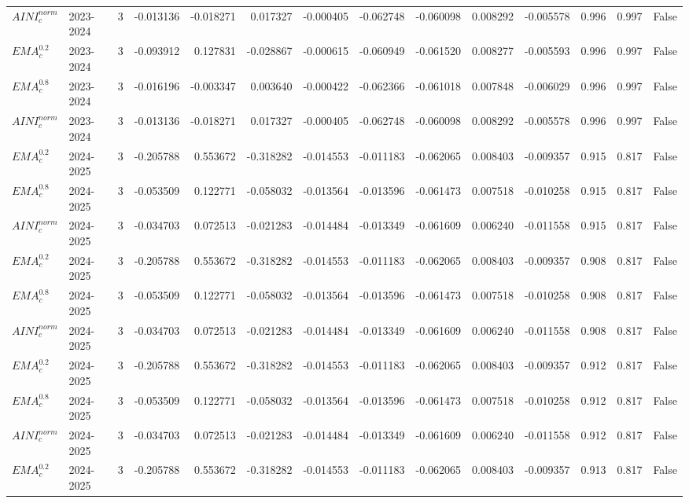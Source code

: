 \begin{tabular}{@{}llrrrrrrrrrlll@{}}
$AINI^{norm}_{c}$ & 2023-2024 & 3 & -0.013136 & -0.018271 & 0.017327 & -0.000405 & -0.062748 & -0.060098 & 0.008292 & -0.005578 & 0.996 & 0.997 & False \\
$EMA^{0.2}_{c}$ & 2023-2024 & 3 & -0.093912 & 0.127831 & -0.028867 & -0.000615 & -0.060949 & -0.061520 & 0.008277 & -0.005593 & 0.996 & 0.997 & False \\
$EMA^{0.8}_{c}$ & 2023-2024 & 3 & -0.016196 & -0.003347 & 0.003640 & -0.000422 & -0.062366 & -0.061018 & 0.007848 & -0.006029 & 0.996 & 0.997 & False \\
$AINI^{norm}_{c}$ & 2023-2024 & 3 & -0.013136 & -0.018271 & 0.017327 & -0.000405 & -0.062748 & -0.060098 & 0.008292 & -0.005578 & 0.996 & 0.997 & False \\
$EMA^{0.2}_{c}$ & 2024-2025 & 3 & -0.205788 & 0.553672 & -0.318282 & -0.014553 & -0.011183 & -0.062065 & 0.008403 & -0.009357 & 0.915 & 0.817 & False \\
$EMA^{0.8}_{c}$ & 2024-2025 & 3 & -0.053509 & 0.122771 & -0.058032 & -0.013564 & -0.013596 & -0.061473 & 0.007518 & -0.010258 & 0.915 & 0.817 & False \\
$AINI^{norm}_{c}$ & 2024-2025 & 3 & -0.034703 & 0.072513 & -0.021283 & -0.014484 & -0.013349 & -0.061609 & 0.006240 & -0.011558 & 0.915 & 0.817 & False \\
$EMA^{0.2}_{c}$ & 2024-2025 & 3 & -0.205788 & 0.553672 & -0.318282 & -0.014553 & -0.011183 & -0.062065 & 0.008403 & -0.009357 & 0.908 & 0.817 & False \\
$EMA^{0.8}_{c}$ & 2024-2025 & 3 & -0.053509 & 0.122771 & -0.058032 & -0.013564 & -0.013596 & -0.061473 & 0.007518 & -0.010258 & 0.908 & 0.817 & False \\
$AINI^{norm}_{c}$ & 2024-2025 & 3 & -0.034703 & 0.072513 & -0.021283 & -0.014484 & -0.013349 & -0.061609 & 0.006240 & -0.011558 & 0.908 & 0.817 & False \\
$EMA^{0.2}_{c}$ & 2024-2025 & 3 & -0.205788 & 0.553672 & -0.318282 & -0.014553 & -0.011183 & -0.062065 & 0.008403 & -0.009357 & 0.912 & 0.817 & False \\
$EMA^{0.8}_{c}$ & 2024-2025 & 3 & -0.053509 & 0.122771 & -0.058032 & -0.013564 & -0.013596 & -0.061473 & 0.007518 & -0.010258 & 0.912 & 0.817 & False \\
$AINI^{norm}_{c}$ & 2024-2025 & 3 & -0.034703 & 0.072513 & -0.021283 & -0.014484 & -0.013349 & -0.061609 & 0.006240 & -0.011558 & 0.912 & 0.817 & False \\
$EMA^{0.2}_{c}$ & 2024-2025 & 3 & -0.205788 & 0.553672 & -0.318282 & -0.014553 & -0.011183 & -0.062065 & 0.008403 & -0.009357 & 0.913 & 0.817 & False \\

\end{tabular}
